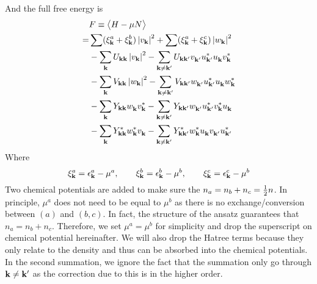 And the full free energy is 
\begin{equation}\label{eq:uvw:F}
 \begin{split}
  &F\equiv\bigl<{H-\mu{}N}\bigr>\\
    =&\sum(\xi^a_{\mathbf{k}}+\xi^b_{\mathbf{k}})\left\lvert{v_{\ensuremath{\mathbf{k}}}}\right\rvert^2+\sum(\xi^a_{\mathbf{k}}+\xi^c_{\mathbf{k}})\left\lvert{w_{\ensuremath{\mathbf{k}}}}\right\rvert^2\\
    &-\sum_{\mathbf{k}}U_{\mathbf{k}\mathbf{k}}\left\lvert{v_{\ensuremath{\mathbf{k}}}}\right\rvert^2-\sum_{\mathbf{k}\neq\mathbf{k}'}U_{\mathbf{k}\mathbf{k}'}v^{}_{\mathbf{k}'}u^*_{\mathbf{k}'}u^{}_{\mathbf{k}}{}v^*_{\mathbf{k}}\\
    &-\sum_{\mathbf{k}}V_{\mathbf{k}\mathbf{k}}\left\lvert{w_{\ensuremath{\mathbf{k}}}}\right\rvert^2
      -\sum_{\mathbf{k}\neq\mathbf{k}'}V_{\mathbf{k}\mathbf{k}'}w^{}_{\mathbf{k}'}u^*_{\mathbf{k}'}u^{}_{\mathbf{k}}{}w^*_{\mathbf{k}}\\
    &-\sum_{\mathbf{k}}Y_{\mathbf{k}\mathbf{k}}w^{}_{\mathbf{k}}v^*_{\mathbf{k}}{}
      -\sum_{\mathbf{k}\neq\mathbf{k}'}Y_{\mathbf{k}\mathbf{k}'}w^{}_{\mathbf{k}'}{u^{*}_{\mathbf{k}'}}v^*_{\mathbf{k}}{}u^{}_{\mathbf{k}}\\
    &-\sum_{\mathbf{k}}Y^*_{\mathbf{k}\mathbf{k}}w^*_{\mathbf{k}}v^{}_{\mathbf{k}}{}
      -\sum_{\mathbf{k}\neq\mathbf{k}'}Y^*_{\mathbf{k}\mathbf{k}'}w^*_{\mathbf{k}}{u^{}_{\mathbf{k}}}v^{}_{\mathbf{k}'}{}u^{*}_{\mathbf{k}'}
 \end{split}
\end{equation}
Where 
\begin{equation*}
 \xi^a_{\mathbf{k}}=\epsilon^a_{\mathbf{k}}-\mu^a,\qquad\xi^b_{\mathbf{k}}=\epsilon^b_{\mathbf{k}}-\mu^b,\qquad\xi^c_{\mathbf{k}}=\epsilon^c_{\mathbf{k}}-\mu^b
\end{equation*}
 Two chemical potentials are added to make sure the $n_a=n_b+n_c=\frac{1}{2}n$.  In principle, $\mu^{a}$ does not need to be equal to $\mu^{b}$  as there is no exchange/conversion between $(a)$ and $(b,c)$.  In fact, the structure of the ansatz guarantees that $n_a=n_b+n_c$. Therefore, we  set $\mu^{a}=\mu^{b}$ for simplicity and drop the superscript on chemical potential hereinafter. 
We will also drop the Hatree terms because they  only relate to the density and thus can be absorbed into the chemical potentials.   In the second summation, we ignore the fact that the summation only go through $\mathbf{k}\neq\mathbf{k}'$ as the correction due to this is in the higher order. 
 
